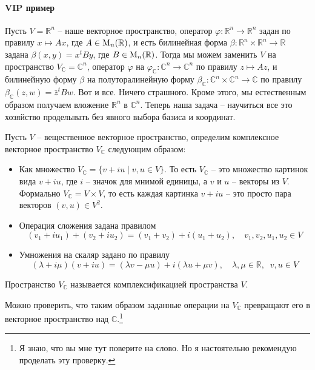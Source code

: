 \paragraph{VIP пример}
Пусть $V = \mathbb R^n$ -- наше векторное пространство, оператор $\varphi \colon \mathbb R^n\to \mathbb R^n$ задан по правилу $x \mapsto Ax$, где $A\in \operatorname{M}_{n}(\mathbb R)$, и есть билинейная форма $\beta \colon \mathbb R^n\times \mathbb R^n\to \mathbb R$ задана $\beta(x,y) = x^t By$, где $B\in \operatorname{M}_{n}(\mathbb R)$. Тогда мы можем заменить $V$ на пространство $V_{\mathbb C} = \mathbb C^n$, оператор $\varphi$ на $\varphi_{\mathbb C}\colon \mathbb C^n \to \mathbb C^n$ по правилу $z\mapsto Az$, и билинейную форму $\beta$ на полуторалинейную форму $\beta_{\mathbb C}\colon \mathbb C^n \times \mathbb C^n \to \mathbb C$ по правилу $\beta_{\mathbb C}(z, w)= \bar z^t B w$. Вот и все. Ничего страшного. Кроме этого, мы естественным образом получаем вложение $\mathbb R^n$ в $\mathbb C^n$. Теперь наша задача -- научиться все это хозяйство проделывать без явного выбора базиса и координат.

\begin{definition}
Пусть $V$ -- вещественное векторное пространство, определим комплексное векторное пространство $V_{\mathbb C}$ следующим образом:
\begin{itemize}
\item Как множество $V_{\mathbb C} = \{v + i u \mid v,u\in V\}$. То есть $V_\mathbb C$ -- это множество картинок вида $v+iu$, где $i$ -- значок для мнимой единицы, а $v$ и $u$ -- векторы из $V$. Формально $V_\mathbb C = V\times V$, то есть каждая картинка $v+iu$ -- это просто пара векторов $(v,u)\in V^2$.
\item Операция сложения задана правилом
\[
(v_1+iu_1) + (v_2 + iu_2) = (v_1+v_2) + i(u_1+u_2),\quad v_1,v_2,u_1,u_2\in V
\]
\item Умножения на скаляр задано по правилу
\[
(\lambda + i\mu) (v+iu) = (\lambda v - \mu u) + i(\lambda u + \mu v),\quad \lambda,\mu \in \mathbb R, \;\; v,u\in V
\]
\end{itemize}
Пространство $V_\mathbb C$ называется комплексификацией пространства $V$.
\end{definition}

Можно проверить, что таким образом заданные операции на $V_\mathbb C$ превращают его в векторное пространство над $\mathbb C$.\footnote{Я знаю, что вы мне тут поверите на слово. Но я настоятельно рекомендую проделать эту проверку.}

